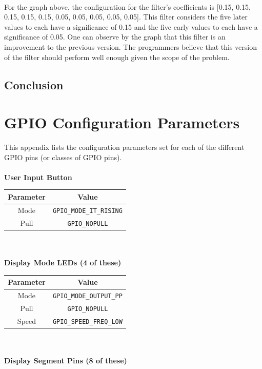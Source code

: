\documentclass[12pt]{report}
\begin{document}
\\For the graph above, the configuration for the filter's coefficients is [0.15, 0.15, 0.15, 0.15, 0.15, 0.05, 0.05, 0.05, 0.05, 0.05]. This filter considers the five later values to each have a significance of 0.15 and the five early values to each have a significance of 0.05. One can observe by the graph that this filter is an improvement to the previous version. The programmers believe that this version of the filter should perform well enough given the scope of the problem.

\section{Conclusion}
\newpage
\begin{appendix}\label{appendices}
	\chapter{GPIO Configuration Parameters}\label{appendixgpio}
	This appendix lists the configuration parameters set for each of the different GPIO pins (or
	classes of GPIO pins).\\\\
	\textbf{User Input Button}\\
	\begin{tabular}{|c|c|}
		\hline
		Parameter & Value\\\hline
		Mode & \texttt{GPIO\_MODE\_IT\_RISING}\\\hline
		Pull & \texttt{GPIO\_NOPULL}\\\hline
	\end{tabular}
	\newline
	\\\\
	\textbf{Display Mode LEDs (4 of these)}\\
	\begin{tabular}{|c|c|}
		\hline
		Parameter & Value\\\hline
		Mode & \texttt{GPIO\_MODE\_OUTPUT\_PP}\\\hline
		Pull & \texttt{GPIO\_NOPULL}\\\hline
		Speed & \texttt{GPIO\_SPEED\_FREQ\_LOW}\\\hline
	\end{tabular}
	\newline
	\\\\
	\textbf{Display Segment Pins (8 of these)}\\
	\begin{tabular}{|c|c|}

\end{tabular}
\end{appendix}
\end{document}
